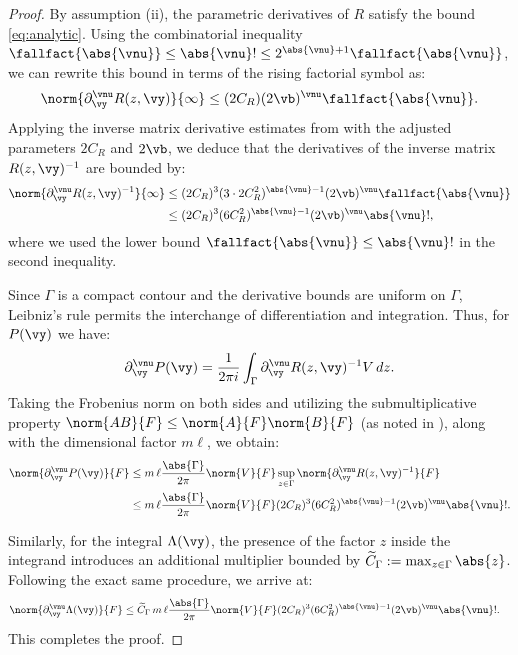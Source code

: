 \begin{proof}
	By assumption (ii), the parametric derivatives of $R$ satisfy the bound \eqref{eq:analytic}. Using the combinatorial inequality $\fallfact{\abs{\vnu}} \leq \abs{\vnu}! \leq 2^{\abs{\vnu}+1}\fallfact{\abs{\vnu}}$, we can rewrite this bound in terms of the rising factorial symbol as:
	\begin{equation}\label{eq:analytic fallfact}
		\norm{\partial_{\vy}^{\vnu} R(z, \vy)}{\infty} \le (2 C_R) (2\vb)^\vnu \fallfact{\abs{\vnu}}.
	\end{equation}
	Applying the inverse matrix derivative estimates from \cite[Lemma 2]{chernov2026gevreyclassregularitysteadystate} with the adjusted parameters $2C_R$ and $2\vb$, we deduce that the derivatives of the inverse matrix $R(z, \vy)^{-1}$ are bounded by:
	\begin{align*}
		\norm{\partial_{\vy}^{\vnu} R(z, \vy)^{-1}}{\infty} 
		&\le (2 C_R)^3 (3 \cdot 2 C_R^2)^{\abs{\vnu}-1} (2\vb)^\vnu \fallfact{\abs{\vnu}} \\
		&\leq (2 C_R)^3 (6 C_R^2)^{\abs{\vnu}-1} (2\vb)^\vnu \abs{\vnu}!,
	\end{align*}
	where we used the lower bound $\fallfact{\abs{\vnu}} \leq \abs{\vnu}!$ in the second inequality.
	
	Since $\Gamma$ is a compact contour and the derivative bounds are uniform on $\Gamma$, Leibniz's rule permits the interchange of differentiation and integration. Thus, for $P(\vy)$ we have:
	\begin{equation*}
		\partial_{\vy}^{\vnu} P(\vy) = \frac{1}{2\pi i} \int_{\Gamma} \partial_{\vy}^{\vnu} R(z, \vy)^{-1} V \, dz.
	\end{equation*}
	Taking the Frobenius norm on both sides and utilizing the submultiplicative property $\norm{A B}{F} \leq \norm{A}{F}\norm{B}{F}$ (as noted in \cite[ (14)]{chernov2026gevreyclassregularitysteadystate}), along with the dimensional factor $m \ell$, we obtain:
	\begin{align*}
		\norm{\partial_{\vy}^{\vnu} P(\vy)}{F}
		&\leq m\,\ell \frac{\abs{\Gamma}}{2\pi} \norm{V}{F} \sup_{z \in \Gamma} \norm{\partial_{\vy}^{\vnu} R(z, \vy)^{-1}}{F} \\
		&\leq m\,\ell \frac{\abs{\Gamma}}{2\pi} \norm{V}{F} (2 C_R)^3 (6 C_R^2)^{\abs{\vnu}-1} (2\vb)^\vnu \abs{\vnu}!.
	\end{align*}
	
	Similarly, for the integral $\Lambda(\vy)$, the presence of the factor $z$ inside the integrand introduces an additional multiplier bounded by $\widetilde C_\Gamma := \max_{z \in \Gamma} \abs{z}$. Following the exact same procedure, we arrive at:
	\begin{align*}
		\norm{\partial_{\vy}^{\vnu} \Lambda(\vy)}{F}
		&\leq \widetilde C_\Gamma \, m\,\ell \frac{\abs{\Gamma}}{2\pi} \norm{V}{F} (2 C_R)^3 (6 C_R^2)^{\abs{\vnu}-1} (2\vb)^\vnu \abs{\vnu}!.
	\end{align*}
	This completes the proof.
\end{proof}


